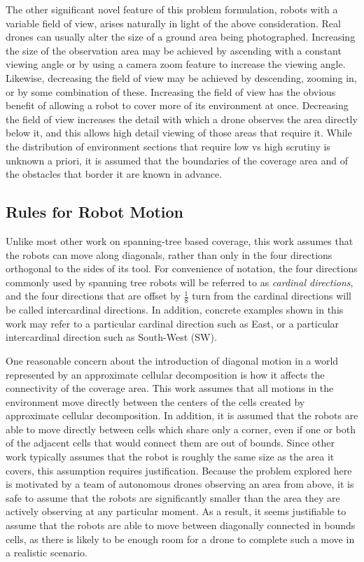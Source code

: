 The other significant novel feature of this problem formulation, robots with a variable field of view, arises naturally in light of the above consideration. Real drones can usually alter the size of a ground area being photographed. Increasing the size of the observation area may be achieved by ascending with a constant viewing angle or by using a camera zoom feature to increase the viewing angle. Likewise, decreasing the field of view may be achieved by descending, zooming in, or by some combination of these. Increasing the field of view has the obvious benefit of allowing a robot to cover more of its environment at once. Decreasing the field of view increases the detail with which a drone observes the area directly below it, and this allows high detail viewing of those areas that require it. While the distribution of environment sections that require low vs high scrutiny is unknown a priori, it is assumed that the boundaries of the coverage area and of the obstacles that border it are known in advance.


\subsection{Rules for Robot Motion}

Unlike most other work on spanning-tree based coverage, this work assumes that the robots can move along diagonals, rather than only in the four directions orthogonal to the sides of its tool. For convenience of notation, the four directions commonly used by spanning tree robots will be referred to as \textit{cardinal directions}, and the four directions that are offset by $\frac{1}{8}$ turn from the cardinal directions will be called intercardinal directions. In addition, concrete examples shown in this work may refer to a particular cardinal direction such as East, or a particular intercardinal direction such as South-West (SW).

One reasonable concern about the introduction of diagonal motion in a world represented by an approximate cellular decomposition is how it affects the connectivity of the coverage area. This work assumes that all motions in the environment move directly between the centers of the cells created by approximate cellular decomposition. In addition, it is assumed that the robots are able to move directly between cells which share only a corner, even if one or both of the adjacent cells that would connect them are out of bounds. Since other work typically assumes that the robot is roughly the same size as the area it covers, this assumption requires justification. Because the problem explored here is motivated by a team of autonomous drones observing an area from above, it is safe to assume that the robots are significantly smaller than the area they are actively observing at any particular moment. As a result, it seems justifiable to assume that the robots are able to move between diagonally connected in bounds cells, as there is likely to be enough room for a drone to complete such a move in a realistic scenario.

